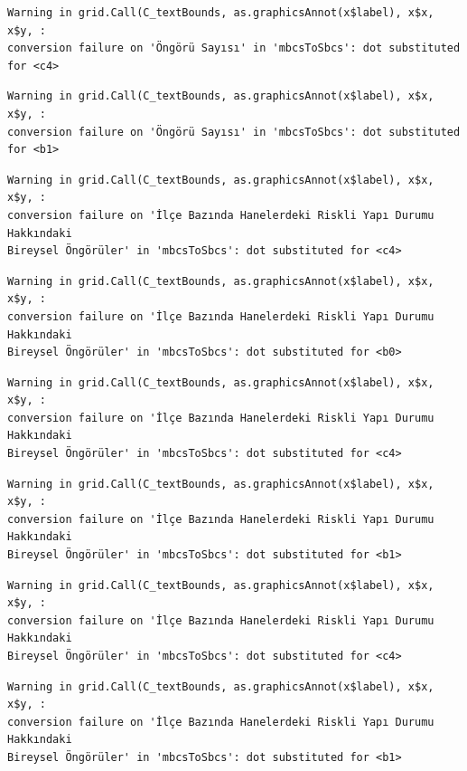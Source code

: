 \documentclass[
  11pt,
  a4paper,
  DIV=11,
  numbers=noendperiod]{scrartcl}
\begin{document}
\begin{verbatim}
Warning in grid.Call(C_textBounds, as.graphicsAnnot(x$label), x$x, x$y, :
conversion failure on 'Öngörü Sayısı' in 'mbcsToSbcs': dot substituted for <c4>
\end{verbatim}

\begin{verbatim}
Warning in grid.Call(C_textBounds, as.graphicsAnnot(x$label), x$x, x$y, :
conversion failure on 'Öngörü Sayısı' in 'mbcsToSbcs': dot substituted for <b1>
\end{verbatim}

\begin{verbatim}
Warning in grid.Call(C_textBounds, as.graphicsAnnot(x$label), x$x, x$y, :
conversion failure on 'İlçe Bazında Hanelerdeki Riskli Yapı Durumu Hakkındaki
Bireysel Öngörüler' in 'mbcsToSbcs': dot substituted for <c4>
\end{verbatim}

\begin{verbatim}
Warning in grid.Call(C_textBounds, as.graphicsAnnot(x$label), x$x, x$y, :
conversion failure on 'İlçe Bazında Hanelerdeki Riskli Yapı Durumu Hakkındaki
Bireysel Öngörüler' in 'mbcsToSbcs': dot substituted for <b0>
\end{verbatim}

\begin{verbatim}
Warning in grid.Call(C_textBounds, as.graphicsAnnot(x$label), x$x, x$y, :
conversion failure on 'İlçe Bazında Hanelerdeki Riskli Yapı Durumu Hakkındaki
Bireysel Öngörüler' in 'mbcsToSbcs': dot substituted for <c4>
\end{verbatim}

\begin{verbatim}
Warning in grid.Call(C_textBounds, as.graphicsAnnot(x$label), x$x, x$y, :
conversion failure on 'İlçe Bazında Hanelerdeki Riskli Yapı Durumu Hakkındaki
Bireysel Öngörüler' in 'mbcsToSbcs': dot substituted for <b1>
\end{verbatim}

\begin{verbatim}
Warning in grid.Call(C_textBounds, as.graphicsAnnot(x$label), x$x, x$y, :
conversion failure on 'İlçe Bazında Hanelerdeki Riskli Yapı Durumu Hakkındaki
Bireysel Öngörüler' in 'mbcsToSbcs': dot substituted for <c4>
\end{verbatim}

\begin{verbatim}
Warning in grid.Call(C_textBounds, as.graphicsAnnot(x$label), x$x, x$y, :
conversion failure on 'İlçe Bazında Hanelerdeki Riskli Yapı Durumu Hakkındaki
Bireysel Öngörüler' in 'mbcsToSbcs': dot substituted for <b1>
\end{verbatim}
\end{document}
